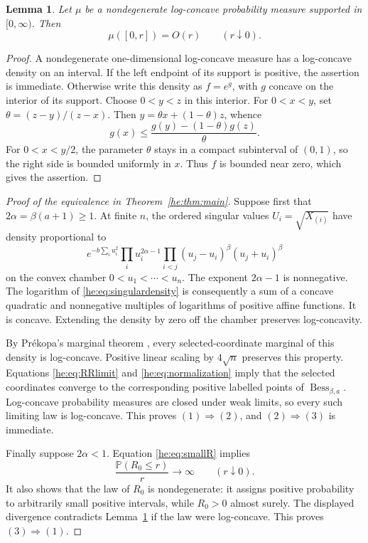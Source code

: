 \documentclass[11pt,a4paper]{article}
\newtheorem{lemma}[theorem]{Lemma}
\theoremstyle{definition}
\theoremstyle{remark}
\newcommand{\PP}{\mathbb P}
\newcommand{\Bess}{\operatorname{Bess}}
\begin{document}
\begin{lemma}\label{he:lem:lcsmallball}
Let $\mu$ be a nondegenerate log-concave probability measure supported
in $[0,\infty)$.  Then
\[
 \mu([0,r])=O(r)\qquad(r\downarrow0).
\]
\end{lemma}

\begin{proof}
A nondegenerate one-dimensional log-concave measure has a
log-concave density on an interval.  If the left endpoint of its
support is positive, the assertion is immediate.  Otherwise write
this density as $f=e^g$, with $g$ concave on the interior of its
support.  Choose $0<y<z$ in this interior.  For $0<x<y$, set
$\theta=(z-y)/(z-x)$.  Then
$y=\theta x+(1-\theta)z$, whence
\[
 g(x)\leq\frac{g(y)-(1-\theta)g(z)}{\theta}.
\]
For $0<x<y/2$, the parameter $\theta$ stays in a compact subinterval
of $(0,1)$, so the right side is bounded uniformly in $x$.
Thus $f$ is bounded near zero, which gives the assertion.
\end{proof}

\begin{proof}[Proof of the equivalence in Theorem~\ref{he:thm:main}]
Suppose first that $2\alpha=\beta(a+1)\geq1$.
At finite $n$, the ordered singular values
$U_i=\sqrt{X_{(i)}}$ have density proportional to
\begin{equation}\label{he:eq:singulardensity}
 e^{-b\sum_i u_i^2}
 \prod_i u_i^{2\alpha-1}
 \prod_{i<j}(u_j-u_i)^\beta(u_j+u_i)^\beta
\end{equation}
on the convex chamber $0<u_1<\cdots<u_n$.
The exponent $2\alpha-1$ is nonnegative.  The logarithm of
\eqref{he:eq:singulardensity} is consequently a sum of a concave
quadratic and nonnegative multiples of logarithms of positive
affine functions.  It is concave.  Extending the density by zero
off the chamber preserves log-concavity.

By Pr\'ekopa's marginal theorem \cite[Theorem~6]{hePrekopa}, every selected-coordinate marginal
of this density is log-concave.  Positive linear scaling by
$4\sqrt n$ preserves this property.  Equations
\eqref{he:eq:RRlimit} and \eqref{he:eq:normalization} imply that the selected
coordinates converge to the corresponding positive labelled points
of $\Bess_{\beta,a}$.  Log-concave probability measures are closed
under weak limits, so every such limiting law is log-concave.
This proves $(1)\Rightarrow(2)$, and $(2)\Rightarrow(3)$ is immediate.

Finally suppose $2\alpha<1$.  Equation \eqref{he:eq:smallR} implies
\[
 \frac{\PP(R_0\leq r)}r\longrightarrow\infty
 \qquad(r\downarrow0).
\]
It also shows that the law of $R_0$ is nondegenerate: it assigns
positive probability to arbitrarily small positive intervals,
while $R_0>0$ almost surely.
The displayed divergence contradicts Lemma~\ref{he:lem:lcsmallball}
if the law were log-concave.  This proves $(3)\Rightarrow(1)$.
\end{proof}
\end{document}
